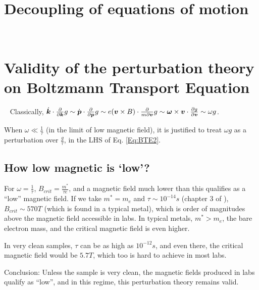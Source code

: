 \documentclass{report}
\renewcommand\vec[1]{\ensuremath\boldsymbol{#1}} %
\begin{document}
\chapter{Decoupling of equations of motion}~\label{app:decoupling-of-eom}
\chapter{Validity of the perturbation theory on Boltzmann Transport Equation}~\label{app:perturbation_validation}
Classically, $\dot{\vec{k}}\cdot\frac{\partial}{\partial \vec{k}} g \sim \dot{\vec{p}}\cdot\frac{\partial}{\partial \vec{p}} g \sim e (\vec{v}\times{B})\cdot\frac{\partial}{m\partial \vec{v}} g \sim \vec{\omega} \times \vec{v}\cdot \frac{\partial g}{\partial \vec{v}} \sim \omega g$.

When $\omega \ll \frac{1}{\tau}$ (in the limit of low magnetic field), it is justified to treat $\omega g$ as a perturbation over $\frac{g}{\tau}$, in the LHS of Eq. \eqref{Eq:BTE2}.
\section{How low magnetic is `low'?}
For $\omega = \frac{1}{\tau}$, $B_{crit} = \frac{m^*}{\tau e}$, and a magnetic field much lower than this qualifies as a ``low'' magnetic field. If we take $m^* = m_e$ and $\tau \sim 10^{-14} s$ (chapter 3 of \cite{book:SimonSolidState}), $B_{crit} \sim 570 T$ (which is found in a typical metal), which is order of magnitudes above the magnetic field accessible in labs. In typical metals, $m^* > m_e$, the bare electron mass, and the critical magnetic field is even higher.

In very clean samples, $\tau$ can be as high as $10^{-12} s$, and even there, the critical magnetic field would be  $5.7 T$, which too is hard to achieve in most labs.

Conclusion: Unless the sample is very clean, the magnetic fields produced in labs qualify as ``low'', and in this regime, this perturbation theory remains valid.


\end{document}
